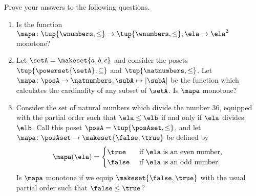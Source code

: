\begin{gradedexercise}
    \label{ex:MonotoneMapCheck?}

    Prove your answers to the following questions.
    \begin{enumerate}
        \item Is the function $\mapa \colon \tup{\wnumbers, \leq} \to \tup{\wnumbers, \leq}, \ela \mapsto \ela^2$ monotone?
        \item Let $\setA = \makeset{a, b, c}$ and consider the posets $\tup{\powerset{\setA}, \subseteq}$ and $\tup{\natnumbers, \leq}$.
              Let $\mapa \colon \posA \to \natnumbers, \subA \mapsto \vert \subA \vert$ be the function which calculates the cardinality of any subset of $\setA$.
              Is $\mapa$ monotone?
        \item Consider the set of natural numbers which divide the number 36, equip\-ped with the partial order such that $\ela \leq \elb$ if and only if $\ela$ divides $\elb$.
              Call this poset $\posA = \tup{\posAset, \leq}$, and let $\mapa \colon \posAset \to \makeset{\false, \true}$ be defined by
              \begin{equation}
                  \mapa(\ela) =
                  \begin{cases}
                      \true  & \text{ if } \ela \text{ is an even number, } \\
                      \false & \text{ if } \ela \text{ is an odd number.
                      }
                  \end{cases}
              \end{equation}
              Is $\mapa$ monotone if we equip $\makeset{\false, \true}$ with the usual partial order such that $\false \leq \true$?
    \end{enumerate}
\end{gradedexercise}

